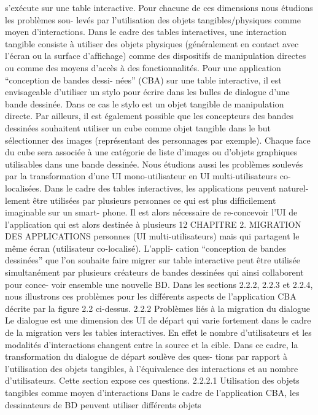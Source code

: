 \documentclass{article}
\begin{document}
s’exécute sur une table interactive. Pour chacune de ces dimensions nous étudions les problèmes sou-
levés par l’utilisation des objets tangibles/physiques comme moyen d’interactions. Dans le cadre des
tables interactives, une interaction tangible consiste à utiliser des objets physiques (généralement
en contact avec l’écran ou la surface d’afﬁchage) comme des dispositifs de manipulation directes ou
comme des moyens d’accès à des fonctionnalités. Pour une application “conception de bandes dessi-
nées” (CBA) sur une table interactive, il est envisageable d’utiliser un stylo pour écrire dans les bulles
de dialogue d’une bande dessinée. Dans ce cas le stylo est un objet tangible de manipulation directe.
Par ailleurs, il est également possible que les concepteurs des bandes dessinées souhaitent utiliser un
cube comme objet tangible dans le but sélectionner des images (représentant des personnages par
exemple). Chaque face du cube sera associée à une catégorie de liste d’images ou d’objets graphiques
utilisables dans une bande dessinée.
Nous étudions aussi les problèmes soulevés par la transformation d’une UI mono-utilisateur en UI
multi-utilisateurs co-localisées. Dans le cadre des tables interactives, les applications peuvent naturel-
lement être utilisées par plusieurs personnes ce qui est plus difﬁcilement imaginable sur un smart-
phone. Il est alors nécessaire de re-concevoir l’UI de l’application qui est alors destinée à plusieurs
12
CHAPITRE 2. MIGRATION DES APPLICATIONS
personnes (UI multi-utilisateurs) mais qui partagent le même écran (utilisateur co-localisé). L’appli-
cation “conception de bandes dessinées” que l’on souhaite faire migrer sur table interactive peut être
utilisée simultanément par plusieurs créateurs de bandes dessinées qui ainsi collaborent pour conce-
voir ensemble une nouvelle BD.
Dans les sections 2.2.2, 2.2.3 et 2.2.4, nous illustrons ces problèmes pour les différents aspects de
l’application CBA décrite par la ﬁgure 2.2 ci-dessus.
2.2.2
Problèmes liés à la migration du dialogue
Le dialogue est une dimension des UI de départ qui varie fortement dans le cadre de la migration
vers les tables interactives. En effet le nombre d’utilisateurs et les modalités d’interactions changent
entre la source et la cible. Dans ce cadre, la transformation du dialogue de départ soulève des ques-
tions par rapport à l’utilisation des objets tangibles, à l’équivalence des interactions et au nombre
d’utilisateurs. Cette section expose ces questions.
2.2.2.1
Utilisation des objets tangibles comme moyen d’interactions
Dans le cadre de l’application CBA, les dessinateurs de BD peuvent utiliser différents objets
\end{document}
